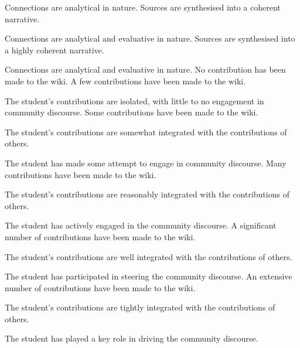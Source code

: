 \documentclass{../../fal_assignment}
\begin{document}
\begin{markingrubric}
		\par		Connections are analytical in nature.
		\grade		Sources are synthesised into a coherent narrative.
		\par		Connections are analytical and evaluative in nature.
		\grade		Sources are synthesised into a highly coherent narrative.
		\par		Connections are analytical and evaluative in nature.
		\grade\fail 	No contribution has been made to the wiki.
		\grade 		A few contributions have been made to the wiki.
		\par		The student's contributions are isolated, with little to no engagement in community discourse.
		\grade 		Some contributions have been made to the wiki.
		\par		The student's contributions are somewhat integrated with the contributions of others.
		\par		The student has made some attempt to engage in community discourse.
		\grade 		Many contributions have been made to the wiki.
		\par		The student's contributions are reasonably integrated with the contributions of others.
		\par		The student has actively engaged in the community discourse.
		\grade 		A significant number of contributions have been made to the wiki.
		\par		The student's contributions are well integrated with the contributions of others.
		\par		The student has participated in steering the community discourse.
		\grade 		An extensive number of contributions have been made to the wiki.
		\par		The student's contributions are tightly integrated with the contributions of others.
		\par		The student has played a key role in driving the community discourse.
	\end{markingrubric}
\end{document}
